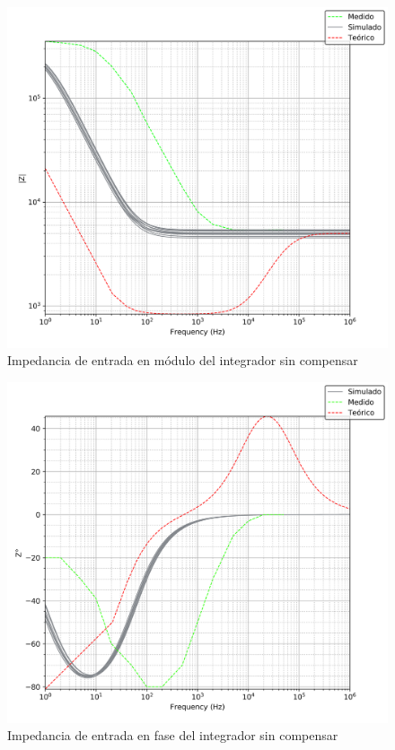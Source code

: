 \begin{figure}[H]
	\centering
	\includegraphics[scale=0.7]{Recursos/Integrador/impedancia_modulo.png}
	\caption{Impedancia de entrada en m\'odulo del integrador sin compensar}
	\label{fig:integrador_impedancia_modulo}
\end{figure}

\begin{figure}[H]
	\centering
	\includegraphics[scale=0.7]{Recursos/Integrador/impedancia_fase.png}
	\caption{Impedancia de entrada en fase del integrador sin compensar}
	\label{fig:integrador_impedancia_fase}
\end{figure}

